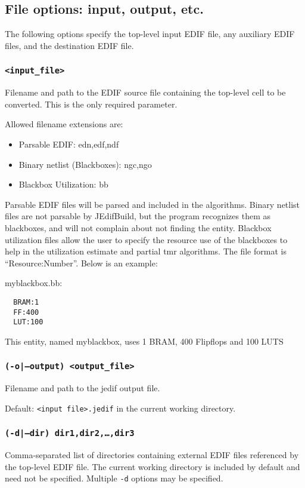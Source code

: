 \subsection{File options: input, output, etc.}
The following options specify the top-level input EDIF file, any auxiliary EDIF
files, and the destination EDIF file.

\subsubsection{\texttt{<input\_file>}}
Filename and path to the EDIF source file containing the top-level cell to be 
converted. This is the only required parameter.

Allowed filename extensions are:
\begin{itemize}
  \item Parsable EDIF: edn,edf,ndf
  \item Binary netlist (Blackboxes): ngc,ngo
  \item Blackbox Utilization: bb
\end{itemize}

Parsable EDIF files will be parsed and included in the algorithms.
Binary netlist files are not parsable by JEdifBuild, but the program
recognizes them as blackboxes, and will not complain about not finding
the entity.  Blackbox utilization files allow the user to specify the
resource use of the blackboxes to help in the utilization estimate and
partial tmr algorithms.  The file format is ``Resource:Number''.
Below is an example:

myblackbox.bb:\\
\begin{verbatim}
  BRAM:1
  FF:400
  LUT:100
\end{verbatim}

This entity, named myblackbox, uses 1 BRAM, 400 Flipflops and 100 LUTS

\subsubsection{\texttt{(-o|--output) <output\_file>}}
Filename and path to the jedif output file.

Default: \texttt{<input file>.jedif} in the current working directory.

\subsubsection{\texttt{(-d|--dir) dir1,dir2,\ldots,dir3}}
Comma-separated list of directories containing external EDIF files
referenced by the top-level EDIF file. The current working directory
is included by default and need not be specified. Multiple \texttt{-d}
options may be specified.

